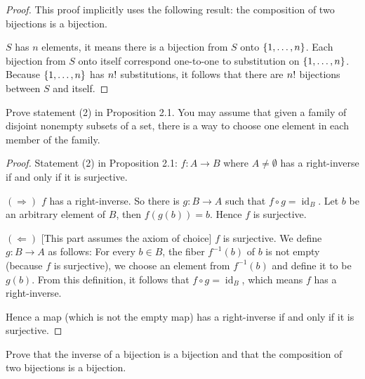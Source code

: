 \begin{proof}
	This proof implicitly uses the following result: the composition of two bijections is a bijection.

	$S$ has $n$ elements, it means there is a bijection from $S$ onto $\left\{{1, \ldots, n}\right\}$. Each bijection from $S$ onto itself correspond one-to-one to substitution on $\left\{{1, \ldots, n}\right\}$. Because $\left\{{1, \ldots, n}\right\}$ has ${n}!$ substitutions, it follows that there are ${n}!$ bijections between $S$ and itself.
\end{proof}

\begin{exercise}{2.2}
	Prove statement (2) in Proposition 2.1. You may assume that given a family of disjoint nonempty subsets of a set, there is a way to choose one element in each
	member of the family.
\end{exercise}

\begin{proof}
	Statement (2) in Proposition 2.1: $f: A\to B$ where $A\ne\emptyset$ has a right-inverse if and only if it is surjective.

	$(\Longrightarrow)$ $f$ has a right-inverse. So there is $g: B\to A$ such that $f\circ g = \operatorname{id}_{B}$. Let $b$ be an arbitrary element of $B$, then $f(g(b)) = b$. Hence $f$ is surjective.

	$(\Longleftarrow)$ [This part assumes the axiom of choice] $f$ is surjective. We define $g: B\to A$ as follows: For every $b\in B$, the fiber $f^{-1}(b)$ of $b$ is not empty (because $f$ is surjective), we choose an element from $f^{-1}(b)$ and define it to be $g(b)$. From this definition, it follows that $f\circ g = \operatorname{id}_{B}$, which means $f$ has a right-inverse.

	Hence a map (which is not the empty map) has a right-inverse if and only if it is surjective.
\end{proof}

\begin{exercise}{2.3}
	Prove that the inverse of a bijection is a bijection and that the composition of two bijections is a bijection.
\end{exercise}


